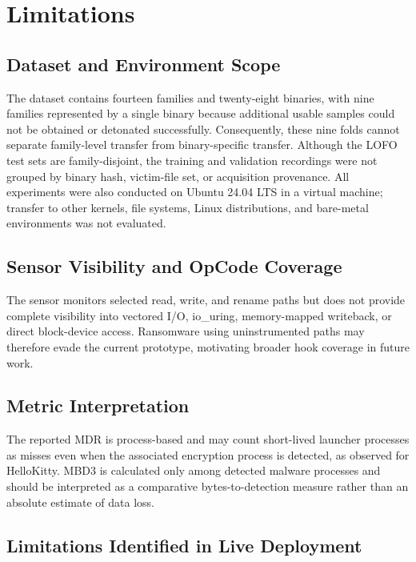 \section{Limitations}\label{sec:5.3}

\subsection{Dataset and Environment Scope}\label{sec:5.3.1}

The dataset contains fourteen families and twenty-eight binaries, with nine families represented by a single binary because additional usable samples could not be obtained or detonated successfully. Consequently, these nine folds cannot separate family-level transfer from binary-specific transfer. Although the LOFO test sets are family-disjoint, the training and validation recordings were not grouped by binary hash, victim-file set, or acquisition provenance. All experiments were also conducted on Ubuntu 24.04 LTS in a virtual machine; transfer to other kernels, file systems, Linux distributions, and bare-metal environments was not evaluated.

\subsection{Sensor Visibility and OpCode Coverage}\label{sec:5.3.2}

The sensor monitors selected read, write, and rename paths but does not provide complete visibility into vectored I/\allowbreak{}O, io\_\allowbreak{}uring, memory-mapped writeback, or direct block-device access. Ransomware using uninstrumented paths may therefore evade the current prototype, motivating broader hook coverage in future work.

\subsection{Metric Interpretation}\label{sec:5.3.3}

The reported MDR is process-based and may count short-lived launcher processes as misses even when the associated encryption process is detected, as observed for HelloKitty. MBD3 is calculated only among detected malware processes and should be interpreted as a comparative bytes-to-detection measure rather than an absolute estimate of data loss.

\subsection{Limitations Identified in Live Deployment}\label{sec:5.3.4}

